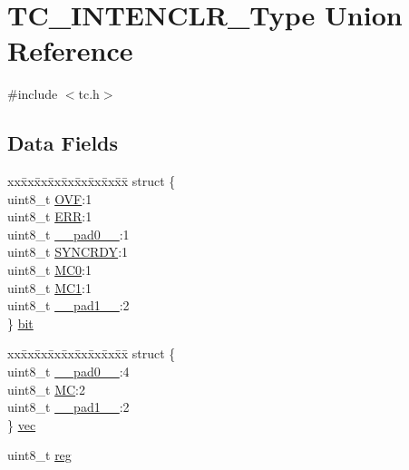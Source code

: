\hypertarget{union_t_c___i_n_t_e_n_c_l_r___type}{}\section{T\+C\+\_\+\+I\+N\+T\+E\+N\+C\+L\+R\+\_\+\+Type Union Reference}
\label{union_t_c___i_n_t_e_n_c_l_r___type}


{\ttfamily \#include $<$tc.\+h$>$}

\subsection*{Data Fields}
\begin{DoxyCompactItemize}
\item 
\begin{tabbing}
xx\=xx\=xx\=xx\=xx\=xx\=xx\=xx\=xx\=\kill
struct \{\\
\>uint8\_t \mbox{\hyperlink{union_t_c___i_n_t_e_n_c_l_r___type_ac6a3a2f132415ccc7b2b360497b74b15}{OVF}}:1\\
\>uint8\_t \mbox{\hyperlink{union_t_c___i_n_t_e_n_c_l_r___type_afb74dff3cfacd68c02883e5282ef2f59}{ERR}}:1\\
\>uint8\_t \mbox{\hyperlink{union_t_c___i_n_t_e_n_c_l_r___type_a8b4eebe79ded0459acec2f4950102ba3}{\_\_pad0\_\_}}:1\\
\>uint8\_t \mbox{\hyperlink{union_t_c___i_n_t_e_n_c_l_r___type_aece75e176e4fd55bf68937f1b56bde63}{SYNCRDY}}:1\\
\>uint8\_t \mbox{\hyperlink{union_t_c___i_n_t_e_n_c_l_r___type_aa3f4a766aece73b336a8d1e8d7cfd990}{MC0}}:1\\
\>uint8\_t \mbox{\hyperlink{union_t_c___i_n_t_e_n_c_l_r___type_a80173c059eec98f333eb801a1d138a0f}{MC1}}:1\\
\>uint8\_t \mbox{\hyperlink{union_t_c___i_n_t_e_n_c_l_r___type_a77f12d2e278bd5c07712648ac0df5e08}{\_\_pad1\_\_}}:2\\
\} \mbox{\hyperlink{union_t_c___i_n_t_e_n_c_l_r___type_ada4ab3e7b83f6b2216251f62eb696f62}{bit}}\\

\end{tabbing}\item 
\begin{tabbing}
xx\=xx\=xx\=xx\=xx\=xx\=xx\=xx\=xx\=\kill
struct \{\\
\>uint8\_t \mbox{\hyperlink{union_t_c___i_n_t_e_n_c_l_r___type_a8b4eebe79ded0459acec2f4950102ba3}{\_\_pad0\_\_}}:4\\
\>uint8\_t \mbox{\hyperlink{union_t_c___i_n_t_e_n_c_l_r___type_a68b0dfa25e78af97366bc6f33149e009}{MC}}:2\\
\>uint8\_t \mbox{\hyperlink{union_t_c___i_n_t_e_n_c_l_r___type_a77f12d2e278bd5c07712648ac0df5e08}{\_\_pad1\_\_}}:2\\
\} \mbox{\hyperlink{union_t_c___i_n_t_e_n_c_l_r___type_a7ddad38bdf6795eca00ad56c9708752f}{vec}}\\

\end{tabbing}\item 
uint8\+\_\+t \mbox{\hyperlink{union_t_c___i_n_t_e_n_c_l_r___type_a9428adc9af4653a2050e2536b55dec8d}{reg}}
\end{DoxyCompactItemize}


